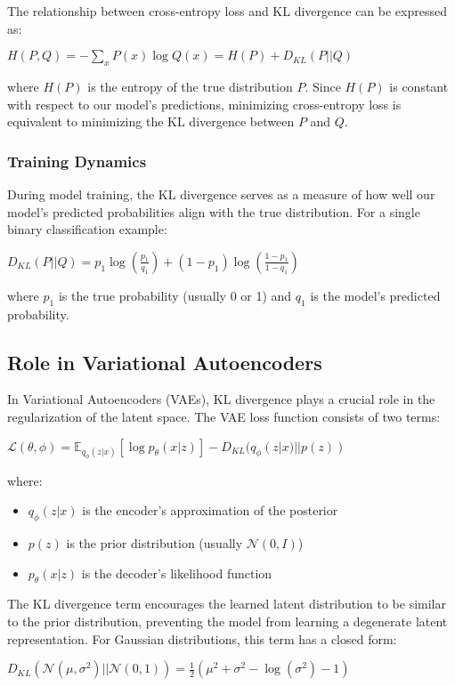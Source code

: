 \documentclass[preprint,12pt]{elsarticle}
\begin{document}
The relationship between cross-entropy loss and KL divergence can be expressed as:

$
H(P,Q) = -\sum_{x} P(x) \log Q(x) = H(P) + D_{KL}(P||Q)
$

where $H(P)$ is the entropy of the true distribution $P$. Since $H(P)$ is constant with respect to our model's predictions, minimizing cross-entropy loss is equivalent to minimizing the KL divergence between $P$ and $Q$.

\subsubsection{Training Dynamics}
During model training, the KL divergence serves as a measure of how well our model's predicted probabilities align with the true distribution. For a single binary classification example:

$
D_{KL}(P||Q) = p_1 \log \left(\frac{p_1}{q_1}\right) + (1-p_1) \log \left(\frac{1-p_1}{1-q_1}\right)
$

where $p_1$ is the true probability (usually 0 or 1) and $q_1$ is the model's predicted probability.

\subsection{Role in Variational Autoencoders}
In Variational Autoencoders (VAEs), KL divergence plays a crucial role in the regularization of the latent space. The VAE loss function consists of two terms:

$
\mathcal{L}(\theta, \phi) = \mathbb{E}_{q_\phi(z|x)}[\log p_\theta(x|z)] - D_{KL}(q_\phi(z|x)||p(z))
$

where:
\begin{itemize}
    \item $q_\phi(z|x)$ is the encoder's approximation of the posterior
    \item $p(z)$ is the prior distribution (usually $\mathcal{N}(0,I)$)
    \item $p_\theta(x|z)$ is the decoder's likelihood function
\end{itemize}

The KL divergence term encourages the learned latent distribution to be similar to the prior distribution, preventing the model from learning a degenerate latent representation. For Gaussian distributions, this term has a closed form:

$
D_{KL}(\mathcal{N}(\mu, \sigma^2)||\mathcal{N}(0,1)) = \frac{1}{2}(\mu^2 + \sigma^2 - \log(\sigma^2) - 1)
$
\end{document}
